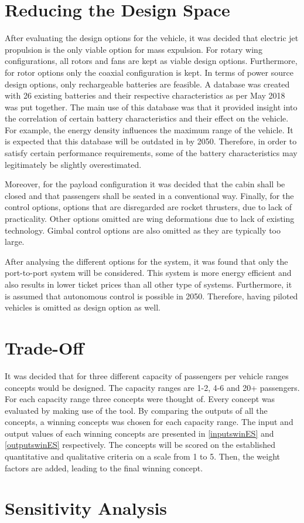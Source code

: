 \section{Reducing the Design Space}
After evaluating the design options for the vehicle, it was decided that electric jet propulsion is the only viable option for mass expulsion. For rotary wing configurations, all rotors and fans are kept as viable design options. Furthermore, for rotor options only the coaxial configuration is kept. In terms of power source design options, only rechargeable batteries are feasible. A database was created with 26 existing batteries and their respective characteristics as per May 2018 was put together. The main use of this database was that it provided insight into the correlation of certain battery characteristics and their effect on the vehicle. For example, the energy density influences the maximum range of the vehicle. It is expected that this database will be outdated in by 2050. Therefore, in order to satisfy certain performance requirements, some of the battery characteristics may legitimately be slightly overestimated. 

Moreover, for the payload configuration it was decided that the cabin shall be closed and that passengers shall be seated in a conventional way. Finally, for the control options, options that are disregarded are rocket thrusters, due to lack of practicality. Other options omitted are wing deformations due to lack of existing technology. Gimbal control options are also omitted as they are typically too large. 

After analysing the different options for the system, it was found that only the port-to-port system will be considered. This system is more energy efficient and also results in lower ticket prices than all other type of systems. Furthermore, it is assumed that autonomous control is possible in 2050. Therefore, having piloted vehicles is omitted as design option as well.

\section{Trade-Off}
It was decided that for three different capacity of passengers per vehicle ranges concepts would be designed. The capacity ranges are 1-2, 4-6 and 20+ passengers. For each capacity range three concepts were thought of. Every concept was evaluated by making use of the tool. By comparing the outputs of all the concepts, a winning concepts was chosen for each capacity range. The input and output values of each winning concepts are presented in \autoref{inputswinES} and \autoref{outputswinES} respectively. The concepts will be scored on the established quantitative and qualitative criteria on a scale from 1 to 5. Then, the weight factors are added, leading to the final winning concept. 

\section{Sensitivity Analysis}











